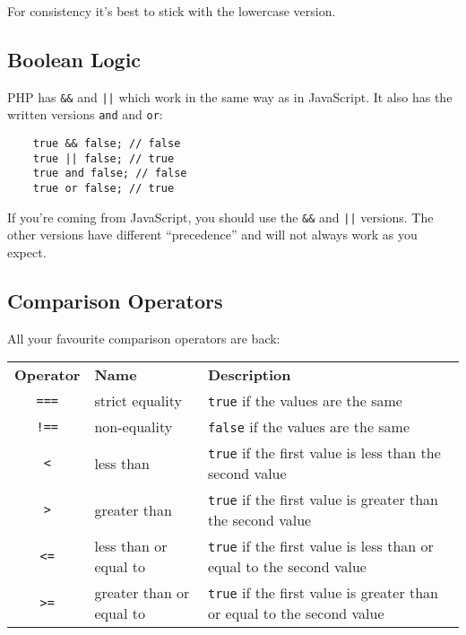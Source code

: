 For consistency it's best to stick with the lowercase version.

\subsection{Boolean Logic}

PHP has \texttt{\&\&} and \texttt{||} which work in the same way as in JavaScript. It also has the written versions \texttt{and} and \texttt{or}:

\begin{verbatim}
    true && false; // false
    true || false; // true
    true and false; // false
    true or false; // true
\end{verbatim}

If you're coming from JavaScript, you should use the \texttt{\&\&} and \texttt{||} versions. The other versions have different ``precedence'' and will not always work as you expect.

\subsection{Comparison Operators}

All your favourite comparison operators are back:
\\

\begin{small}
    \begin{tabu}{c l X}
        \textbf{Operator} & \textbf{Name} & \textbf{Description} \\
        \texttt{===} & strict equality & \texttt{true} if the values are the same \\
        \texttt{!==} & non-equality & \texttt{false} if the values are the same\\
        \texttt{<} & less than & \texttt{true} if the first value is less than the second value  \\
        \texttt{>} & greater than & \texttt{true} if the first value is greater than the second value\\
        \texttt{<=} & less than or equal to & \texttt{true} if the first value is less than or equal to the second value  \\
        \texttt{>=} & greater than or equal to & \texttt{true} if the first value is greater than or equal to the second value
    \end{tabu}
\end{small}

\par\bigskip

